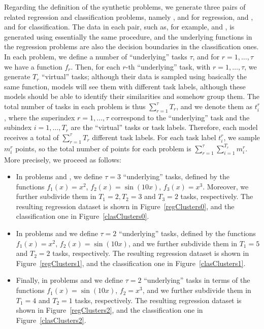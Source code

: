 Regarding the definition of the synthetic problems, we generate three pairs of related regression and classification problems, namely ,  and  for regression, and ,  and  for classification.
The data in each pair, such as, for example,  and , is generated using essentially the same procedure, and the underlying functions in the regression problems are also the decision boundaries in the classification ones.
%
In each problem, we define a number of ``underlying'' tasks $\tau$, and for $r=1, \ldots, \tau$ we have a function $f_r$.
Then, for each $r$-th ``underlying'' task, with $r=1, \ldots, \tau$, we generate $T_r$ ``virtual'' tasks; although their data is sampled using basically the same function, models will see them with different task labels, although these models should be able to identify their similarities and somehow group them.
%
The total number of tasks in each problem is thus $\sum_{r=1}^{\tau} T_r$, and we denote them as $t_i^r$, where the superindex $r=1, \ldots, \tau$ correspond to the ``underlying'' task and the subindex $i=1, \ldots, T_r$ are the ``virtual'' tasks or task labels. Therefore, each model receives a total of $\sum_{r=1}^\tau T_r$ different task labels.
%
For each task label $t_i^r$, we sample $m_i^r$ points, so the total number of points for each problem is $\sum_{r=1}^\tau \sum_{i=1}^{T_r} m_i^r$.
%
More precisely, we proceed as follows:
\begin{itemize}
    \item In problems  and , we define $\tau=3$ ``underlying'' tasks, defined by the functions $f_1(x) = x^2$,  $f_2(x) = \sin(10x)$, $f_3(x) = x^3$. Moreover, we further subdivide them in $T_1 = 2, T_2 = 3$ and $T_3 = 2$ tasks, respectively. The resulting regression dataset is shown in Figure~\ref{regClusters0}, and the classification one in Figure~\ref{clasClusters0}. 
    \item In problems  and  we define $\tau=2$ ``underlying'' tasks, defined by the functions $f_1(x) = x^2$,  $f_2(x) = \sin(10x)$, and we further subdivide them in
    $T_1 = 5$ and $T_2 = 2$ tasks, respectively. The resulting regression dataset is shown in Figure~\ref{regClusters1}, and the classification one in Figure~\ref{clasClusters1}. 
    \item Finally, in problems  and  we define $\tau=2$ ``underlying'' tasks in terms of the functions $f_1(x) = \sin(10x)$, $f_2 = x^3$, and we further subdivide them in
    $T_1 = 4$ and $T_2 = 1$ tasks, respectively. The resulting regression dataset is shown in Figure~\ref{regClusters2}, and the classification one in Figure~\ref{clasClusters2}.
\end{itemize}
